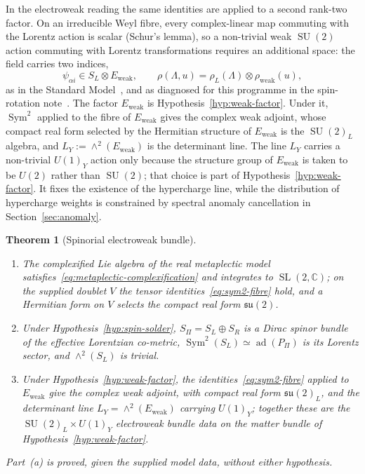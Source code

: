 \documentclass[11pt,a4paper]{article}
\newtheorem{theorem}{Theorem}[section]
\theoremstyle{definition}
\theoremstyle{remark}
\newcommand{\SL}{\operatorname{SL}}
\newcommand{\SU}{\operatorname{SU}}
\begin{document}
    In the electroweak reading the same identities are applied to a second rank-two factor.
    On an irreducible Weyl fibre, every complex-linear map commuting with the Lorentz action is scalar
    (Schur's lemma), so a non-trivial weak $\SU(2)$ action commuting with Lorentz transformations requires
    an additional space: the field carries two indices,
    \[
      \psi_{\alpha i} \in S_L \otimes E_{\mathrm{weak}},
      \qquad
      \rho(\Lambda, u) = \rho_L(\Lambda) \otimes \rho_{\mathrm{weak}}(u),
    \]
    as in the Standard Model~\cite{Tong2024SM}, and as diagnosed for this programme in the spin-rotation
    note~\cite{Beau2026srn}.
    The factor $E_{\mathrm{weak}}$ is Hypothesis~\ref{hyp:weak-factor}.
    Under it, $\operatorname{Sym}^2$ applied to the fibre of $E_{\mathrm{weak}}$ gives the complex weak
    adjoint, whose compact real form selected by the Hermitian structure of $E_{\mathrm{weak}}$ is the
    $\SU(2)_L$ algebra, and $L_Y := \wedge^2(E_{\mathrm{weak}})$ is the determinant line.
    The line $L_Y$ carries a non-trivial $U(1)_Y$ action only because the structure group of
    $E_{\mathrm{weak}}$ is taken to be $U(2)$ rather than $\SU(2)$; that choice is part of
    Hypothesis~\ref{hyp:weak-factor}.
    It fixes the existence of the hypercharge line, while the distribution of hypercharge weights is
    constrained by spectral anomaly cancellation in Section~\ref{sec:anomaly}.

    \begin{theorem}[Spinorial electroweak bundle]
      \label{thm:spinorial-electroweak-bundle}
      \begin{enumerate}
        \item[\emph{(a)}] The complexified Lie algebra of the real metaplectic model
        satisfies~\eqref{eq:metaplectic-complexification} and integrates to $\SL(2,\mathbb{C})$; on the
        supplied doublet $V$ the tensor identities~\eqref{eq:sym2-fibre} hold, and a Hermitian form on $V$
        selects the compact real form $\mathfrak{su}(2)$.
        \item[\emph{(b)}] Under Hypothesis~\ref{hyp:spin-solder}, $S_\Pi = S_L \oplus S_R$ is a Dirac spinor
        bundle of the effective Lorentzian co-metric, $\operatorname{Sym}^2(S_L) \simeq
        \operatorname{ad}(P_\Pi)$ is its Lorentz sector, and $\wedge^2(S_L)$ is trivial.
        \item[\emph{(c)}] Under Hypothesis~\ref{hyp:weak-factor}, the identities~\eqref{eq:sym2-fibre}
        applied to $E_{\mathrm{weak}}$ give the complex weak adjoint, with compact real form
        $\mathfrak{su}(2)_L$, and the determinant line $L_Y = \wedge^2(E_{\mathrm{weak}})$ carrying
        $U(1)_Y$; together these are the $\SU(2)_L \times U(1)_Y$ electroweak bundle data on the matter
        bundle of Hypothesis~\ref{hyp:weak-factor}.
      \end{enumerate}
      Part~(a) is proved, given the supplied model data, without either hypothesis.
    \end{theorem}
\end{document}
